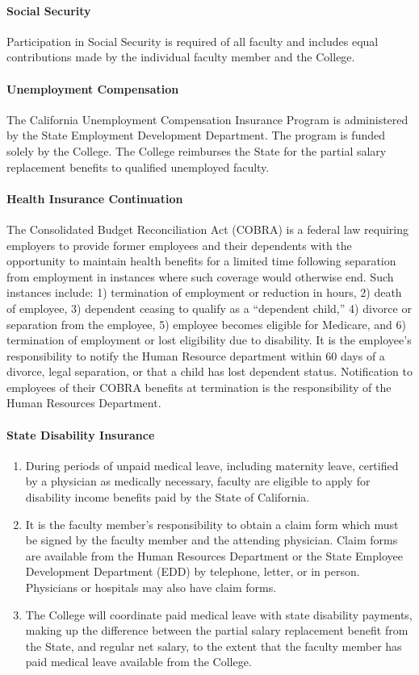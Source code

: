 			\paragraph{Social Security}
				Participation in Social Security is required of all faculty and includes equal contributions made by the individual faculty member and the College.
			\paragraph{Unemployment Compensation}
				The California Unemployment Compensation Insurance Program is administered by the State Employment Development Department.  The program is funded solely by the College. The College reimburses the State for the partial salary replacement benefits to qualified unemployed faculty.

			\paragraph{Health Insurance Continuation}
				The Consolidated Budget Reconciliation Act (COBRA) is a federal law requiring employers to provide former employees and their dependents with the opportunity to maintain health benefits for a limited time following separation from employment in instances where such coverage would otherwise end.  Such instances include:  1) termination of employment or reduction in hours, 2) death of employee, 3) dependent ceasing to qualify as a ``dependent child,'' 4) divorce or separation from the employee, 5) employee becomes eligible for Medicare, and 6) termination of employment or lost eligibility due to disability.  It is the employee's responsibility to notify the Human Resource department within 60 days of a divorce, legal separation, or that a child has lost dependent status.  Notification to employees of their COBRA benefits at termination is the responsibility of the Human Resources Department.
			\paragraph{State Disability Insurance}
				\begin{enumerate}[label=\alph*)]
					\item{During periods of unpaid medical leave, including maternity leave, certified by a physician as medically necessary, faculty are eligible to apply for disability income benefits paid by the State of California.}
					\item{It is the faculty member's responsibility to obtain a claim form which must be signed by the faculty member and the attending physician.  Claim forms are available from the Human Resources Department or the State Employee Development Department (EDD) by telephone, letter, or in person.  Physicians or hospitals may also have claim forms.}
					\item{The College will coordinate paid medical leave with state disability payments, making up the difference between the partial salary replacement benefit from the State, and regular net salary, to the extent that the faculty member has paid medical leave available from the College.}
				\end{enumerate}
